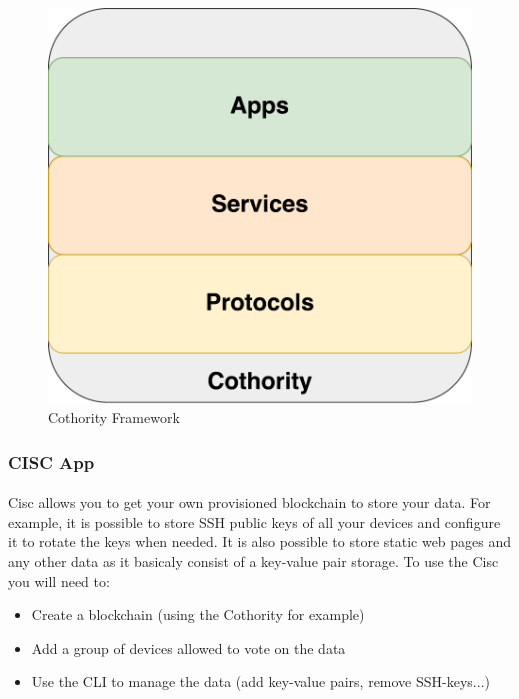 \begin{figure}[h]
\includegraphics[scale=.5]{graphic/cothority.pdf}
\centering
\caption*{Cothority Framework}
\end{figure}

\subsubsection*{CISC App\raisebox{.3\baselineskip}{\normalsize\footnotemark}}

\paragraph{}
Cisc allows you to get your own provisioned blockchain to store your data. For example, it is possible to store SSH public keys of all your devices and configure it to rotate the keys when needed. It is also possible to store static web pages and any other data as it basicaly consist of a key-value pair storage. To use the Cisc you will need to:


\begin{itemize}
  \item Create a blockchain (using the Cothority for example)
  \item Add a group of devices allowed to vote on the data
  \item Use the CLI to manage the data (add key-value pairs, remove SSH-keys...)
\end{itemize}

